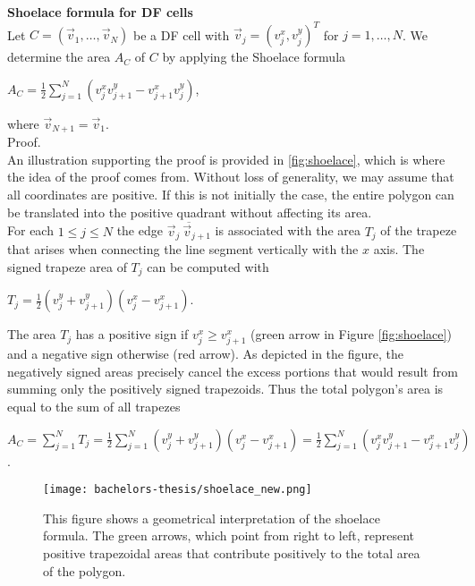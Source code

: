 \begin{proposition}  \textbf{Shoelace formula for DF cells} \label{prop:Shoelace}\\ 
	Let $C = (\vec{v}_1, \ldots, \vec{v}_N)$ be a DF cell with $\vec{v}_j = (v_j^{x}, v_j^{y})^T$ for $j=1,\ldots,N$.
	We determine the area $A_C$ of $C$ by applying the Shoelace formula
	\begin{center}
		$A_C = \frac{1}{2}\sum\limits_{j = 1}^{N} (v_j^{x} v_{j+1}^{y} - v_{j+1}^{x} v_j^{y})$,
	\end{center} 
	where $\vec{v}_{N + 1} = \vec{v}_1$. \\
	Proof. 	\\
	An illustration supporting the proof is provided in \ref{fig:shoelace}, which is where the idea of the proof comes from. 
	Without loss of generality, we may assume that all coordinates are positive.
	If this is not initially the case, the entire polygon can be translated into the positive quadrant without affecting its area. \\
	For each $1 \leq j \leq N$ the edge $\overline{ \vec{v}_j \: \vec{v}_{j+1}}$ is associated with the area $T_j$ of the trapeze that arises when connecting the line segment vertically with the $x$ axis. 
	The signed trapeze area of $T_j$ can be computed with 
	\begin{center}
		$T_j = \frac{1}{2} (v_j^{y} + v_{j+1}^{y})(v_j^{x} - v_{j+1}^{x})$.
	\end{center}
	The area $T_j$ has a positive sign if $v_j^{x} \geq v_{j+1}^{x}$ (green arrow in Figure \ref{fig:shoelace}) and a negative sign otherwise (red arrow). 
	As depicted in the figure, the negatively signed areas precisely cancel the excess portions that would result from summing only the positively signed trapezoids.
	Thus the total polygon's area is equal to the sum of all trapezes
	\begin{center}
		$A_C = \sum\limits_{j = 1}^{N} T_j = \frac{1}{2} \sum\limits_{j = 1}^{N} (v_j^{y} + v_{j+1}^{y})(v_j^{x} - v_{j+1}^{x}) = \frac{1}{2}\sum\limits_{j = 1}^{N} (v_j^{x} v_{j+1}^{y} - v_{j+1}^{x} v_j^{y}) $.
	\end{center} 
	\begin{figure}
		\begin{center}
			\texttt{[image: bachelors-thesis/shoelace\_new.png]}
			\caption{
				This figure shows a geometrical interpretation of the shoelace formula.
				The green arrows, which point from right to left, represent positive trapezoidal areas that contribute positively to the total area of the polygon.
}
\end{center}
\end{figure}
\end{proposition}
